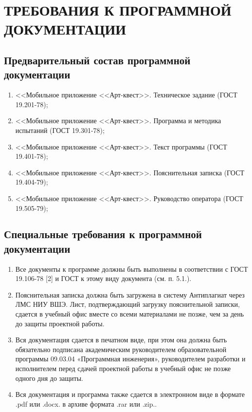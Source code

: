 \pagestyle{fancy}



	\section{ТРЕБОВАНИЯ К ПРОГРАММНОЙ ДОКУМЕНТАЦИИ}


\subsection{Предварительный состав программной документации} 
	
\normalsize
\begin{enumerate}
	\item <<Мобильное приложение <<Арт-квест>>. Техническое задание (ГОСТ 19.201-78);
	\item <<Мобильное приложение <<Арт-квест>>. Программа и методика испытаний (ГОСТ 19.301-78);
	\item <<Мобильное приложение <<Арт-квест>>. Текст программы (ГОСТ 19.401-78);
	\item <<Мобильное приложение <<Арт-квест>>. Пояснительная записка (ГОСТ 19.404-79);
	\item <<Мобильное приложение <<Арт-квест>>. Руководство оператора (ГОСТ 19.505-79); 
\end{enumerate}
	
\subsection{Специальные требования к программной документации}

	\begin{enumerate}
		\item Все документы к программе должны быть выполнены в соответствии с ГОСТ 19.106-78 [2] и ГОСТ к этому виду документа (см. п. 5.1.).
		\item Пояснительная записка должна быть загружена в систему Антиплагиат через ЛМС НИУ ВШЭ. Лист, подтверждающий загрузку пояснительной записки, сдается в учебный офис вместе со всеми материалами не позже, чем за день до защиты проектной работы.
		\item Вся документация сдается в печатном виде, при этом она должна быть обязательно подписана академическим руководителем образовательной программы 09.03.04 «Программная инженерия», руководителем разработки и исполнителем перед сдачей проектной работы в учебный офис не позже одного дня до защиты.
		\item Вся документация и программа также сдается в электронном виде в формате .pdf или .docx. в архиве формата .rar или .zip..
	\end{enumerate}
	

